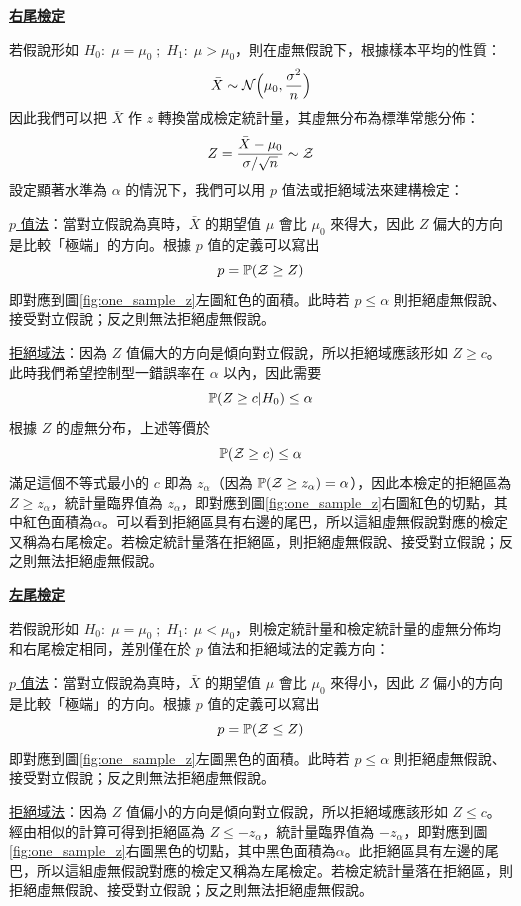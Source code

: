     \noindent\underline{\textbf{右尾檢定}}

    若假說形如 $H_0: \; \mu = \mu_0 \; ; \; H_1: \; \mu > \mu_0$，則在虛無假說下，根據樣本平均的性質：
    \[\bar{X} \sim \mathcal{N}\Big(\mu_0, \frac{\sigma^2}{n}\Big)\]
    因此我們可以把 $\bar{X}$ 作 $z$ 轉換當成檢定統計量，其虛無分布為標準常態分佈：
    \[Z = \frac{\bar{X}-\mu_0}{\sigma/\sqrt{n}} \sim \mathcal{Z}\]
    設定顯著水準為 $\alpha$ 的情況下，我們可以用 $p$ 值法或拒絕域法來建構檢定：

    \noindent \underline{$p$ 值法}：當對立假說為真時，$\bar{X}$ 的期望值 $\mu$ 會比 $\mu_0$ 來得大，因此 $Z$ 偏大的方向是比較「極端」的方向。根據 $p$ 值的定義可以寫出
    \[p = \mathbb{P}(\mathcal{Z} \ge Z)\]
    即對應到圖\ref{fig:one_sample_z}左圖紅色的面積。此時若 $p \le \alpha$ 則拒絕虛無假說、接受對立假說；反之則無法拒絕虛無假說。
    
    \noindent \underline{拒絕域法}：因為 $Z$ 值偏大的方向是傾向對立假說，所以拒絕域應該形如 $Z \ge c$。此時我們希望控制型一錯誤率在 $\alpha$ 以內，因此需要
    \[\mathbb{P}(Z \ge c|H_0) \le \alpha\]
    根據 $Z$ 的虛無分布，上述等價於
    \[\mathbb{P}(\mathcal{Z} \ge c) \le \alpha\]
    滿足這個不等式最小的 $c$ 即為 $z_\alpha$（因為 $\mathbb{P}(\mathcal{Z} \ge z_\alpha) = \alpha$），因此本檢定的拒絕區為 $Z \ge z_\alpha$，統計量臨界值為 $z_\alpha$，即對應到圖\ref{fig:one_sample_z}右圖紅色的切點，其中紅色面積為$\alpha$。可以看到拒絕區具有右邊的尾巴，所以這組虛無假說對應的檢定又稱為右尾檢定。若檢定統計量落在拒絕區，則拒絕虛無假說、接受對立假說；反之則無法拒絕虛無假說。

    \noindent\underline{\textbf{左尾檢定}}

    若假說形如 $H_0: \; \mu = \mu_0 \; ; \; H_1: \; \mu < \mu_0$，則檢定統計量和檢定統計量的虛無分佈均和右尾檢定相同，差別僅在於 $p$ 值法和拒絕域法的定義方向：

    \noindent \underline{$p$ 值法}：當對立假說為真時，$\bar{X}$ 的期望值 $\mu$ 會比 $\mu_0$ 來得小，因此 $Z$ 偏小的方向是比較「極端」的方向。根據 $p$ 值的定義可以寫出
    \[p = \mathbb{P}(\mathcal{Z} \le Z)\]
    即對應到圖\ref{fig:one_sample_z}左圖黑色的面積。此時若 $p \le \alpha$ 則拒絕虛無假說、接受對立假說；反之則無法拒絕虛無假說。
    
    \noindent \underline{拒絕域法}：因為 $Z$ 值偏小的方向是傾向對立假說，所以拒絕域應該形如 $Z \le c$。經由相似的計算可得到拒絕區為 $Z \le -z_\alpha$，統計量臨界值為 $-z_\alpha$，即對應到圖\ref{fig:one_sample_z}右圖黑色的切點，其中黑色面積為$\alpha$。此拒絕區具有左邊的尾巴，所以這組虛無假說對應的檢定又稱為左尾檢定。若檢定統計量落在拒絕區，則拒絕虛無假說、接受對立假說；反之則無法拒絕虛無假說。

